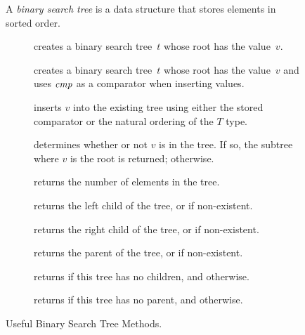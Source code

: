 \begin{figure}[tp]
    \small
    \begin{tcolorbox}[title=Teaching Java Binary Search Trees]
      A \emph{binary search tree} is a data structure that stores elements in sorted order.
      \vspace{2ex}
    \begin{description}
      \item [] creates a binary search tree~$t$ whose root has the value~$v$.
      \item [] creates a binary search tree~$t$ whose root has the value~$v$ and uses $\emph{cmp}$ as a comparator when inserting values.
      \item [] inserts $v$ into the existing tree using either the stored comparator or the natural ordering of the $T$ type.
      \item [] determines whether or not $v$ is in the tree. If so, the subtree where $v$ is the root is returned;  otherwise.
      \item [] returns the number of elements in the tree.
      \item [] returns the left child of the tree, or  if non-existent.
      \item [] returns the right child of the tree, or  if non-existent.
      \item [] returns the parent of the tree, or  if non-existent.
      \item [] returns  if this tree has no children, and  otherwise.
      \item [] returns  if this tree has no parent, and  otherwise.
    \end{description}
  \end{tcolorbox}
    \caption{Useful Binary Search Tree Methods.}
    \label{fig:bstmethods}
  \end{figure}

